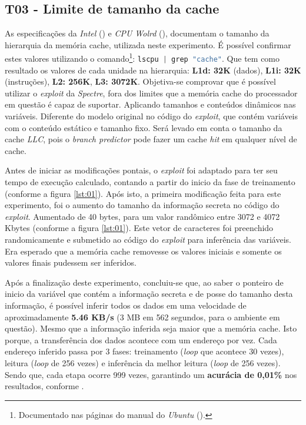 \documentclass[
	article,			    %
	12pt,				    %
	oneside,			    %
	a4paper,			    %
	chapter=TITLE,		    %
	section=TITLE,		    %
	subsection=TITLE,	    %
	english,			    %
	brazil,				    %
	sumario=tradicional
]{abntex2}
\begin{document}
\begin{comment}
explicar mais sobre o que é "contexto" nesse sentindo
\end{comment}

\subsection{T03 - Limite de tamanho da cache}
As especificações da \emph{Intel} (\citeyear{Intel2019Corei3}) e \emph{CPU Wolrd} (\citeyear{CPU2016Corei3}), documentam o tamanho da hierarquia da memória cache, utilizada neste experimento. É possível confirmar estes valores utilizando o comando\footnote{Documentado nas páginas do manual do \emph{Ubuntu} (\citeyear{Ubuntu2019Lscpu}).}: \lstinline[language=C, style=c]{lscpu | grep "cache"}. Que tem como resultado os valores de cada unidade na hierarquia: \textbf{L1d: 32K} (dados), \textbf{L1i: 32K} (instruções), \textbf{L2: 256K}, \textbf{L3: 3072K}. Objetiva-se comprovar que é possível utilizar o \emph{exploit} da \emph{Spectre}, fora dos limites que a memória cache do processador em questão é capaz de suportar. Aplicando tamanhos e conteúdos dinâmicos nas variáveis. Diferente do modelo original no código do \emph{exploit}, que contém variáveis com o conteúdo estático e tamanho fixo. Será levado em conta o tamanho da cache \emph{LLC}, pois o \emph{branch predictor} pode fazer um cache \emph{hit} em qualquer nível de cache.

Antes de iniciar as modificações pontais, o \emph{exploit} foi adaptado para ter seu tempo de execução calculado, contando a partir do inicio da fase de treinamento (conforme a figura \ref{lst:01}). Após isto, a primeira modificação feita para este experimento, foi o aumento do tamanho da informação secreta no código do \emph{exploit}. Aumentado de 40 bytes, para um valor randômico entre 3072 e 4072 Kbytes (conforme a figura \ref{lst:01}). Este vetor de caracteres foi preenchido randomicamente e submetido ao código do \emph{exploit} para inferência das variáveis. Era esperado que a memória cache removesse os valores iniciais e somente os valores finais pudessem ser inferidos.



Após a finalização deste experimento, concluiu-se que, ao saber o ponteiro de inicio da variável que contém a informação secreta e de posse do tamanho desta informação, é possível inferir todos os dados em uma velocidade de aproximadamente \textbf{5.46 KB/s} (3 MB em 562 segundos, para o ambiente em questão). Mesmo que a informação inferida seja maior que a memória cache. Isto porque, a transferência dos dados acontece com um endereço por vez. Cada endereço inferido passa por 3 fases: treinamento (\emph{loop} que acontece 30 vezes), leitura (\emph{loop} de 256 vezes) e inferência da melhor leitura (\emph{loop} de 256 vezes). Sendo que, cada etapa ocorre 999 vezes, garantindo um \textbf{acurácia de 0,01\%} nos resultados, conforme .
\end{document}
